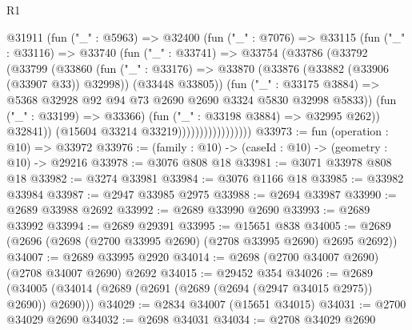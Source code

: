 \begin{lexlean}{R1}
\begin{coremodule}
                          @31911
                            (fun ("_" : @5963) =>
                            @32400
                              (fun ("_" : @7076) =>
                              @33115
                                (fun ("_" : @33116) =>
                                @33740
                                  (fun ("_" : @33741) =>
                                  @33754
                                    (@33786
                                      (@33792
                                        (@33799
                                          (@33860
                                            (fun ("_" : @33176) =>
                                            @33870
                                              (@33876 (@33882 (@33906 (@33907 @33)) @32998))
                                              (@33448 @33805))
                                            (fun ("_" : @33175 @3884) =>
                                            @5368
                                              @32928
                                              @92
                                              @94
                                              @73
                                              @2690
                                              @2690
                                              @3324
                                              @5830
                                              @32998
                                              @5833))
                                          (fun ("_" : @33199) => @33366)
                                          (fun ("_" : @33198 @3884) => @32995 @262))
                                        @32841))
                                    (@15604 @33214 @33219)))))))))))))))))
@33973 := fun (operation : @10) => @33972
@33976 := (family : @10) -> (caseId : @10) -> (geometry : @10) -> @29216
@33978 := @3076 @808 @18
@33981 := @3071 @33978 @808 @18
@33982 := @3274 @33981
@33984 := @3076 @1166 @18
@33985 := @33982 @33984
@33987 := @2947 @33985 @2975
@33988 := @2694 @33987
@33990 := @2689 @33988 @2692
@33992 := @2689 @33990 @2690
@33993 := @2689 @33992
@33994 := @2689 @29391
@33995 := @15651 @838
@34005 := @2689 (@2696 (@2698 (@2700 @33995 @2690) (@2708 @33995 @2690) @2695 @2692))
@34007 := @2689 @33995 @2920
@34014 := @2698 (@2700 @34007 @2690) (@2708 @34007 @2690) @2692
@34015 := @29452 @354
@34026 := @2689 (@34005 (@34014 (@2689 (@2691 (@2689 (@2694 (@2947 @34015 @2975)) @2690)) @2690)))
@34029 := @2834 @34007 (@15651 @34015)
@34031 := @2700 @34029 @2690
@34032 := @2698 @34031
@34034 := @2708 @34029 @2690

\end{coremodule}
\end{lexlean}
